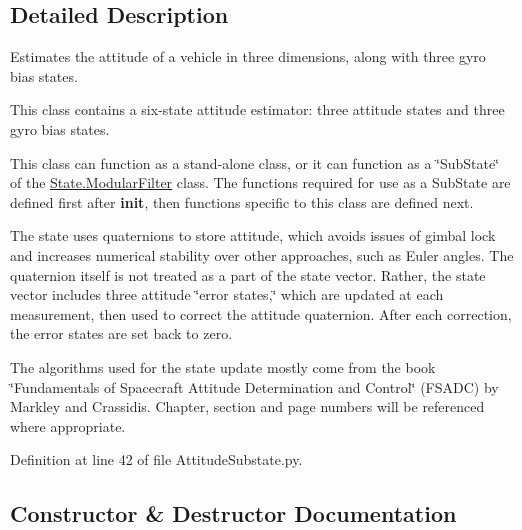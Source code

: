 \subsection{Detailed Description}
Estimates the attitude of a vehicle in three dimensions, along with three gyro bias states. 

This class contains a six-\/state attitude estimator\+: three attitude states and three gyro bias states.

This class can function as a stand-\/alone class, or it can function as a \char`\"{}\+Sub\+State\char`\"{} of the \hyperlink{classState_1_1ModularFilter}{State.\+Modular\+Filter} class. The functions required for use as a Sub\+State are defined first after {\bfseries init}, then functions specific to this class are defined next.

The state uses quaternions to store attitude, which avoids issues of gimbal lock and increases numerical stability over other approaches, such as Euler angles. The quaternion itself is not treated as a part of the state vector. Rather, the state vector includes three attitude \char`\"{}error states,\char`\"{} which are updated at each measurement, then used to correct the attitude quaternion. After each correction, the error states are set back to zero.

The algorithms used for the state update mostly come from the book \char`\"{}\+Fundamentals of Spacecraft Attitude Determination and Control\char`\"{} (F\+S\+A\+DC) by Markley and Crassidis. Chapter, section and page numbers will be referenced where appropriate. 

Definition at line 42 of file Attitude\+Substate.\+py.



\subsection{Constructor \& Destructor Documentation}
